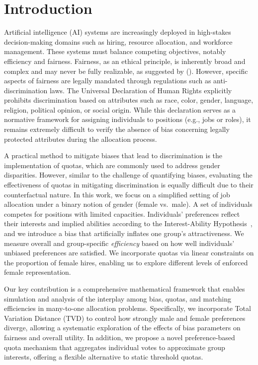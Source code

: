 \documentclass[letterpaper]{article}
\newcommand{\citet}[1]{\citeauthor{#1} (\citeyear{#1})}
\begin{document}
\section{Introduction}
Artificial intelligence (AI) systems are increasingly deployed in high-stakes decision-making domains such as hiring, resource allocation, and workforce management. These systems must balance competing objectives, notably efficiency and fairness. Fairness, as an ethical principle, is inherently broad and complex and may never be fully realizable, as suggested by \citet{Peterson_Hamrouni_2022}. However, specific aspects of fairness are legally mandated through regulations such as anti-discrimination laws. The Universal Declaration of Human Rights \cite{udhr1948} explicitly prohibits discrimination based on attributes such as race, color, gender, language, religion, political opinion, or social origin. While this declaration serves as a normative framework for assigning individuals to positions (e.g., jobs or roles), it remains extremely difficult to verify the absence of bias concerning legally protected attributes during the allocation process.

A practical method to mitigate biases that lead to discrimination is the implementation of quotas, which are commonly used to address gender disparities. However, similar to the challenge of quantifying biases, evaluating the effectiveness of quotas in mitigating discrimination is equally difficult due to their counterfactual nature. In this work, we focus on a simplified setting of job allocation under a binary notion of gender (female vs.\ male). A set of individuals competes for positions with limited capacities. Individuals' preferences reflect their interests and implied abilities according to the Interest-Ability Hypothesis~\cite{jintelligence10030043}, and we introduce a bias that artificially inflates one group's attractiveness. We measure overall and group-specific \textit{efficiency} based on how well individuals' unbiased preferences are satisfied. We incorporate quotas via linear constraints on the proportion of female hires, enabling us to explore different levels of enforced female representation. 

Our key contribution is a comprehensive mathematical framework that enables simulation and analysis of the interplay among bias, quotas, and matching efficiencies in many-to-one allocation problems. Specifically, we incorporate Total Variation Distance (TVD) to control how strongly male and female preferences diverge, allowing a systematic exploration of the effects of bias parameters on fairness and overall utility. In addition, we propose a novel preference-based quota mechanism that aggregates individual votes to approximate group interests, offering a flexible alternative to static threshold quotas.
\end{document}
